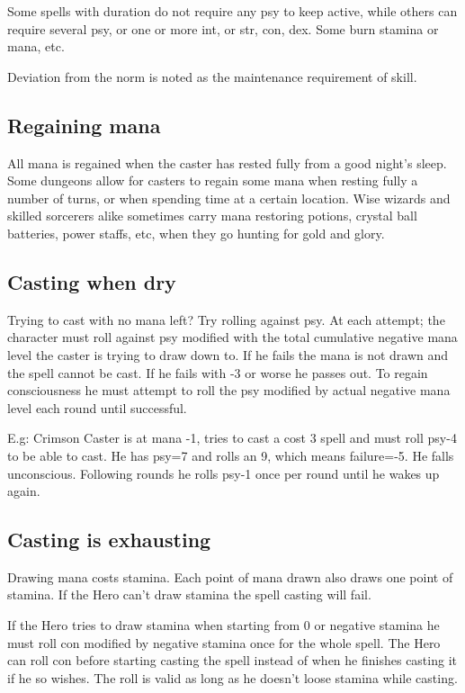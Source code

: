 Some spells with duration do not require any psy to keep active, while others can require several psy, or one or more int, or str, con, dex. Some burn stamina or mana, etc.

Deviation from the norm is noted as the maintenance requirement of skill.



\subsection*{Regaining mana}
All mana is regained when the caster has rested fully from a good night's sleep. Some dungeons allow for casters to regain some mana when resting fully a number of turns, or when spending time at a certain location.
Wise wizards and skilled sorcerers alike sometimes carry mana restoring potions, crystal ball batteries, power staffs, etc, when they go hunting for gold and glory.


\subsection*{Casting when dry}
Trying to cast with no mana left? Try rolling against psy. At each attempt; the character must roll against psy modified with the total cumulative negative mana level the caster is trying to draw down to. If he fails the mana is not drawn and the spell cannot be cast. If he fails with -3 or worse he passes out. To regain consciousness he must attempt to roll the psy modified by actual negative mana level each round until successful.

E.g: Crimson Caster is at mana -1, tries to cast a cost 3 spell and must roll psy-4 to be able to cast. He has psy=7 and rolls an 9, which means failure=-5. He falls unconscious. Following rounds he rolls psy-1 once per round until he wakes up again.


\subsection*{Casting is exhausting}
Drawing mana costs stamina. Each point of mana drawn also draws one point of stamina. If the Hero can't draw stamina the spell casting will fail.

If the Hero tries to draw stamina when starting from 0 or negative stamina he must roll con modified by negative stamina once for the whole spell. The Hero can roll con before starting casting the spell instead of when he finishes casting it if he so wishes. The roll is valid as long as he doesn't loose stamina while casting.


